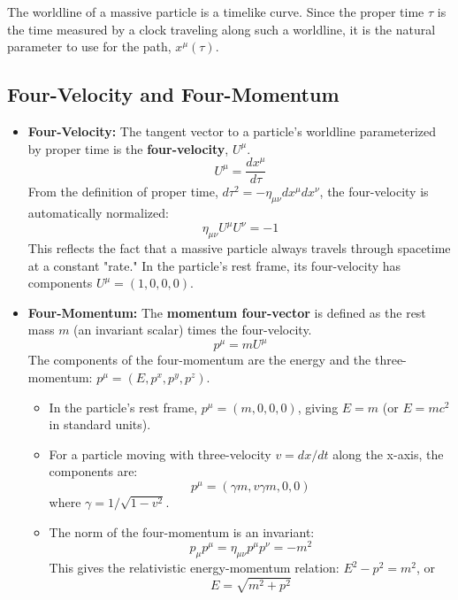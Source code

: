 \documentclass[11pt, a4paper]{report}
\begin{document}
The worldline of a massive particle is a timelike curve. Since the proper time $\tau$ is the time measured by a clock traveling along such a worldline, it is the natural parameter to use for the path, $x^\mu(\tau)$.

\subsection*{Four-Velocity and Four-Momentum}

\begin{itemize}
    \item \textbf{Four-Velocity:} The tangent vector to a particle's worldline parameterized by proper time is the \textbf{four-velocity}, $U^\mu$.
    \begin{equation}
        U^\mu = \frac{dx^\mu}{d\tau}
    \end{equation}
    From the definition of proper time, $d\tau^2 = -\eta_{\mu\nu}dx^\mu dx^\nu$, the four-velocity is automatically normalized:
    \begin{equation}
        \eta_{\mu\nu}U^\mu U^\nu = -1
    \end{equation}
    This reflects the fact that a massive particle always travels through spacetime at a constant "rate." In the particle's rest frame, its four-velocity has components $U^\mu = (1, 0, 0, 0)$.

    \item \textbf{Four-Momentum:} The \textbf{momentum four-vector} is defined as the rest mass $m$ (an invariant scalar) times the four-velocity.
    \begin{equation}
        p^\mu = mU^\mu
    \end{equation}
    The components of the four-momentum are the energy and the three-momentum: $p^\mu = (E, p^x, p^y, p^z)$.
    \begin{itemize}
        \item In the particle's rest frame, $p^\mu = (m, 0, 0, 0)$, giving $E=m$ (or $E=mc^2$ in standard units).
        \item For a particle moving with three-velocity $v = dx/dt$ along the x-axis, the components are:
        \begin{equation}
            p^\mu = (\gamma m, v\gamma m, 0, 0)
        \end{equation}
        where $\gamma = 1/\sqrt{1-v^2}$.
        \item The norm of the four-momentum is an invariant:
        \begin{equation}
            p_\mu p^\mu = \eta_{\mu\nu}p^\mu p^\nu = -m^2
        \end{equation}
        This gives the relativistic energy-momentum relation: $E^2 - p^2 = m^2$, or
        \begin{equation}
            E = \sqrt{m^2 + p^2}
        \end{equation}
    \end{itemize}
\end{itemize}
\end{document}
